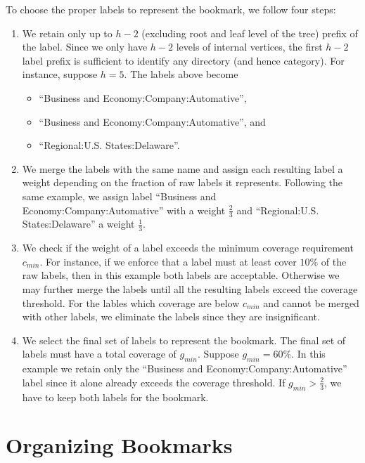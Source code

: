 To choose the proper labels to represent the bookmark, we follow four
steps:
\begin{enumerate} 
\item We retain only up to $h - 2$ (excluding root and leaf
level of the tree) prefix of the label.
Since we only have $h - 2$ levels of internal vertices, the 
first $h - 2$ label prefix is sufficient to identify any
directory (and hence category). For instance, suppose $h = 5$.
The labels above become
 \begin{itemize}
 \item ``Business and Economy:Company:Automative'',
 \item ``Business and Economy:Company:Automative'', and
 \item ``Regional:U.S. States:Delaware''.
 \end{itemize}
\item We merge the labels with the same name and assign
each resulting label a weight depending on the fraction of raw
labels it represents. Following the same example, we assign
label ``Business and Economy:Company:Automative'' with 
a weight $\frac{2}{3}$ and 
``Regional:U.S. States:Delaware'' a weight $\frac{1}{3}$. 
\item We check if the weight of a label exceeds the minimum
coverage requirement $c_{min}$. For instance, if we 
enforce that a label must at least cover $10\%$ of the
raw labels, then in this example both labels are
acceptable. Otherwise we may further merge the
labels until all the resulting labels exceed the coverage
threshold. For the lables which coverage are below
$c_{min}$ and cannot be merged with other labels,
we eliminate the labels since they are insignificant.
\item We select the final set of labels to represent the
bookmark. The final set of labels must have a total 
coverage of $g_{min}$. Suppose $g_{min} = 60\%$.
In this example we retain only the 
``Business and Economy:Company:Automative'' 
label since it alone already exceeds the coverage threshold.
If $g_{min} > \frac{2}{3}$, we have to keep both labels for
the bookmark.
\end{enumerate}

\section{Organizing Bookmarks}
\label{sec-build-tree}


